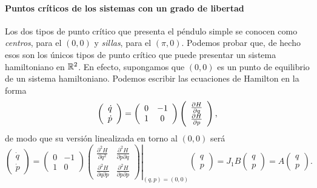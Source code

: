   \paragraph{\bf Puntos críticos de los sistemas con un grado de libertad}\mbox{}

   Los dos tipos de punto crítico que presenta el péndulo simple se conocen como \emph{centros}, para el $(0,0)$ y \emph{sillas}, para el $(\pi,0)$. Podemos probar que, de hecho esos son los únicos tipos de punto crítico que puede presentar un sistema hamiltoniano en $\mathbb{R}^2$. En efecto, supongamos que $(0,0)$ es un punto de equilibrio de un sistema hamiltoniano. Podemos escribir las ecuaciones de Hamilton en la forma
   \begin{equation*}
     \left(
     \begin{array}{c}
       \dot q \\
       \dot p
     \end{array}
     \right)=
\left(
     \begin{array}{cc}
       0 & -1\\
       1 & 0
     \end{array}
     \right)
\left(
     \begin{array}{c}
       \frac{\partial H}{\partial q} \\
       \frac{\partial H}{\partial p}
     \end{array}
     \right),
   \end{equation*}
   de modo que su versión linealizada en torno al $(0,0)$ será
   \begin{equation*}
     \left(
     \begin{array}{c}
       \dot q \\
       \dot p
     \end{array}
     \right)=
\left(
     \begin{array}{cc}
       0 & -1\\
       1 & 0
     \end{array}
     \right)
     \left.
\left(
     \begin{array}{cc}
       \frac{\partial^2 H}{\partial q^2} & \frac{\partial^2 H}{\partial p \partial q} \\
       \frac{\partial^2 H}{\partial q \partial p} & \frac{\partial^2 H}{\partial p \partial p} 
     \end{array}
     \right)
     \right|_{(q,p)=(0,0)}
\left(
     \begin{array}{c}
       q \\
       p
     \end{array}
     \right)
     =J_1 B
\left(
     \begin{array}{c}
       q \\
       p
     \end{array}
     \right)
     =A
\left(
     \begin{array}{c}
       q \\
       p
     \end{array}
     \right).
   \end{equation*}
